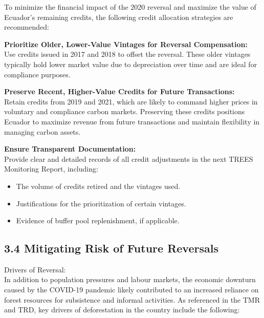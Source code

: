 \documentclass[
  letterpaper,
  DIV=11,
  numbers=noendperiod]{scrartcl}
\providecommand{\tightlist}{%
  \setlength{\itemsep}{0pt}\setlength{\parskip}{0pt}}\usepackage{longtable,booktabs,array}
\begin{document}
To minimize the financial impact of the 2020 reversal and maximize the
value of Ecuador's remaining credits, the following credit allocation
strategies are recommended:

\textbf{Prioritize Older, Lower-Value Vintages for Reversal
Compensation:}\\
Use credits issued in 2017 and 2018 to offset the reversal. These older
vintages typically hold lower market value due to depreciation over time
and are ideal for compliance purposes.

\textbf{Preserve Recent, Higher-Value Credits for Future
Transactions:}\\
Retain credits from 2019 and 2021, which are likely to command higher
prices in voluntary and compliance carbon markets. Preserving these
credits positions Ecuador to maximize revenue from future transactions
and maintain flexibility in managing carbon assets.

\textbf{Ensure Transparent Documentation:}\\
Provide clear and detailed records of all credit adjustments in the next
TREES Monitoring Report, including:

\begin{itemize}
\tightlist
\item
  The volume of credits retired and the vintages used.
\item
  Justifications for the prioritization of certain vintages.
\item
  Evidence of buffer pool replenishment, if applicable.
\end{itemize}

\hypertarget{mitigating-risk-of-future-reversals}{%
\subsection{3.4 Mitigating Risk of Future
Reversals}\label{mitigating-risk-of-future-reversals}}

Drivers of Reversal:\\
In addition to population pressures and labour markets, the economic
downturn caused by the COVID-19 pandemic likely contributed to an
increased reliance on forest resources for subsistence and informal
activities. As referenced in the TMR and TRD, key drivers of
deforestation in the country include the following:
\end{document}
